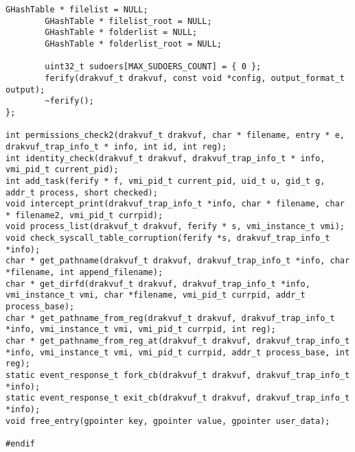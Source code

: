 \begin{lstlisting}[style=CStyle]
		GHashTable * filelist = NULL;
		GHashTable * filelist_root = NULL;
		GHashTable * folderlist = NULL;
		GHashTable * folderlist_root = NULL;

		uint32_t sudoers[MAX_SUDOERS_COUNT] = { 0 };
		ferify(drakvuf_t drakvuf, const void *config, output_format_t output);
		~ferify();
};

int permissions_check2(drakvuf_t drakvuf, char * filename, entry * e, drakvuf_trap_info_t * info, int id, int reg);
int identity_check(drakvuf_t drakvuf, drakvuf_trap_info_t * info, vmi_pid_t current_pid);
int add_task(ferify * f, vmi_pid_t current_pid, uid_t u, gid_t g, addr_t process, short checked);
void intercept_print(drakvuf_trap_info_t *info, char * filename, char * filename2, vmi_pid_t currpid);
void process_list(drakvuf_t drakvuf, ferify * s, vmi_instance_t vmi);
void check_syscall_table_corruption(ferify *s, drakvuf_trap_info_t *info);
char * get_pathname(drakvuf_t drakvuf, drakvuf_trap_info_t *info, char *filename, int append_filename);
char * get_dirfd(drakvuf_t drakvuf, drakvuf_trap_info_t *info, vmi_instance_t vmi, char *filename, vmi_pid_t currpid, addr_t process_base);
char * get_pathname_from_reg(drakvuf_t drakvuf, drakvuf_trap_info_t *info, vmi_instance_t vmi, vmi_pid_t currpid, int reg);
char * get_pathname_from_reg_at(drakvuf_t drakvuf, drakvuf_trap_info_t *info, vmi_instance_t vmi, vmi_pid_t currpid, addr_t process_base, int reg);
static event_response_t fork_cb(drakvuf_t drakvuf, drakvuf_trap_info_t *info);
static event_response_t exit_cb(drakvuf_t drakvuf, drakvuf_trap_info_t *info);
void free_entry(gpointer key, gpointer value, gpointer user_data);

#endif

\end{lstlisting}

